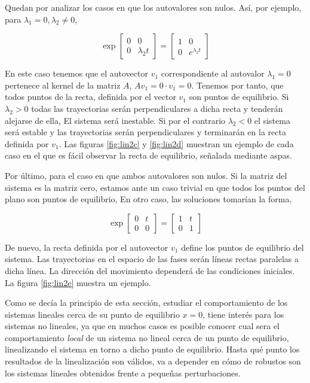 Quedan por analizar los casos en que los autovalores son nulos. Así, por ejemplo, para $\lambda_1 = 0, \lambda_2 \ne 0$,  

\begin{equation}
\exp\begin{bmatrix}
0 & 0\\ 0 & \lambda_2 t
\end{bmatrix} = 
\begin{bmatrix}
1 & 0\\
0 & e^{\lambda_2 t}
\end{bmatrix}
\end{equation}

En este caso tenemos que el autovector $v_1$ correspondiente al autovalor $\lambda_1=0$ pertenece al kernel de la matriz $A$, $Av_1 = 0\cdot v_1 = 0$. Tenemos por tanto, que todos puntos de la recta, definida por el vector $v_1$ son puntos de equilibrio. Si $\lambda_2 >0$ todas las trayectorias serán perpendiculares a dicha recta y tenderán alejarse de ella, El sistema será inestable. Si por el contrario $\lambda_2 < 0 $ el sistema será estable y las trayectorias serán perpendiculares y terminarán en la recta definida por $v_1$. Las figuras \ref{fig:lin2c} y \ref{fig:lin2d} muestran un ejemplo de cada caso en el que es fácil observar la recta de equilibrio, señalada mediante aspas.

Por último, para el caso en que ambos autovalores son nulos. Si la matriz del sistema es la matriz cero, estamos ante un caso trivial en que todos los puntos del plano son puntos de equilibrio, En otro caso, las soluciones tomarían la forma,

\begin{equation}
\exp\begin{bmatrix}
0 & t\\ 0 & 0
\end{bmatrix} = 
\begin{bmatrix}
1 & t\\
0 & 1
\end{bmatrix}
\end{equation}

De nuevo, la recta definida por el autovector $v_1$ define los puntos de equilibrio del sistema. Las trayectorias en el espacio de las fases serán líneas rectas paralelas a dicha línea. La dirección del movimiento dependerá de las condiciones iniciales. La figura \ref{fig:lin2e} muestra un ejemplo.

Como se decía la principio de esta sección, estudiar el comportamiento de los sistemas lineales cerca de su punto de equilibrio $x=0$, tiene interés para los sistemas no lineales, ya que en muchos casos es posible conocer cual sera el comportamiento \emph{local} de un sistema no lineal cerca de un punto de equilibrio, linealizando el sistema en torno a dicho punto de equilibrio. Hasta qué punto los resultados de la linealización son válidos, va a depender en cómo de robustos son los sistemas lineales obtenidos frente a pequeñas perturbaciones. 

